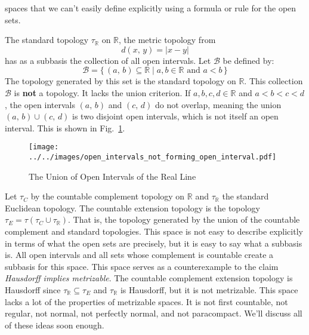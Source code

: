 \documentclass{article}
\theoremstyle{plain}
\theoremstyle{normal}
\newenvironment{example}{%
    \pushQED{\qed}\renewcommand{\qedsymbol}{$\blacksquare$}\examplex%
}{%
    \popQED\endexamplex%
}
\begin{document}
        spaces that we can't easily define explicitly using a formula or rule
        for the open sets. 
        \begin{example}
            The standard topology $\tau_{\mathbb{R}}$ on $\mathbb{R}$, the
            metric topology from
            \begin{equation}
                d(x,\,y)=|x-y|
            \end{equation}
            has as a subbasis the
            collection of all open intervals. Let $\mathcal{B}$ be
            defined by:
            \begin{equation}
                \mathcal{B}=\{\,(a,\,b)\subseteq\mathbb{R}\;|\;a,b\in\mathbb{R}
                    \textrm{ and }a<b\,\}
            \end{equation}
            The topology generated by this set is the standard topology on
            $\mathbb{R}$. This collection $\mathcal{B}$ is \textbf{not} a
            topology. It lacks the union criterion. If $a,b,c,d\in\mathbb{R}$
            and $a<b<c<d$, the open intervals
            $(a,\,b)$ and $(c,\,d)$ do not overlap, meaning the union
            $(a,\,b)\cup(c,\,d)$ is two disjoint open intervals, which is not
            itself an open interval. This is shown in
            Fig.~\ref{fig:open_intervals_not_forming_open_interval}.
        \end{example}
        \begin{figure}
            \centering
            \texttt{[image: ../../images/open\_intervals\_not\_forming\_open\_interval.pdf]}
            \caption{The Union of Open Intervals of the Real Line}
            \label{fig:open_intervals_not_forming_open_interval}
        \end{figure}
        \begin{example}[\textbf{The Countable Extension Topology}]
            Let $\tau_{C}$ by the countable complement topology on
            $\mathbb{R}$ and $\tau_{\mathbb{R}}$ the standard Euclidean
            topology. The countable extension topology is the topology
            $\tau_{E}=\tau(\tau_{C}\cup\tau_{\mathbb{R}})$. That is, the
            topology generated by the union of the countable complement and
            standard topologies. This space is not easy to describe explicitly
            in terms of what the open sets are precisely, but it is easy to
            say what a subbasis is. All open intervals and all sets whose
            complement is countable create a subbasis for this space. This space
            serves as a counterexample to the claim
            \textit{Hausdorff implies metrizable}. The countable complement
            extension topology is Hausdorff since
            $\tau_{\mathbb{R}}\subseteq\tau_{E}$ and $\tau_{\mathbb{R}}$ is
            Hausdorff, but it is not metrizable. This space lacks a lot of the
            properties of metrizable spaces.
            It is not first countable, not regular, not normal, not
            perfectly normal, and not paracompact. We'll discuss all of these
            ideas soon enough.
        \end{example}
\end{document}
